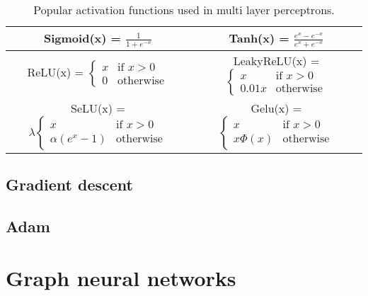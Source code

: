 \begin{table}[h]
	\caption{Popular activation functions used in multi layer perceptrons.}
	\begin{center}
		\begin{tabular}{c|c}
			\toprule
			Sigmoid(x) = $ \frac{1}{1 + e^{-x}}$ &
			Tanh(x) = $\frac{e^x - e^{-x}}{e^x + e^{-x}}$ \\
			\midrule
			ReLU(x) = $\begin{cases}
					           x & \text{if } x > 0 \\
					           0 & \text{otherwise}
				           \end{cases}$             &
			LeakyReLU(x) =  $\begin{cases}
					                 x      & \text{if } x > 0 \\
					                 0.01 x & \text{otherwise}
				                 \end{cases}$
			\\
			\midrule
			SeLU(x) = $\lambda \begin{cases}
					                   x               & \text{if } x > 0 \\
					                   \alpha(e^x - 1) & \text{otherwise}
				                   \end{cases}$
			                                     &
			Gelu(x) = $\begin{cases}
					           x        & \text{if } x > 0 \\
					           x\Phi(x) & \text{otherwise}
				           \end{cases}$
			\\
			\bottomrule
		\end{tabular}
	\end{center}
\end{table}



\subsection{Gradient descent}

\subsection{Adam}


\section{Graph neural networks}


